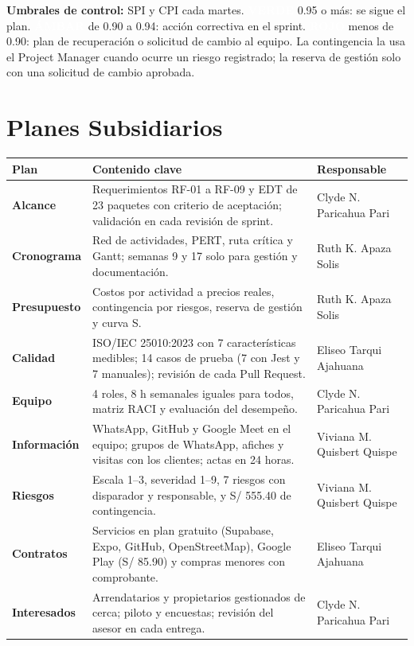 \documentclass[11pt,a4paper]{article}
\newcommand{\etiqueta}[2]{{\setlength{\fboxsep}{2pt}\colorbox{#1}{\textcolor{white}{\scriptsize\bfseries #2}}}}
\begin{document}
\vspace{0.1cm}
\noindent\textbf{Umbrales de control:} SPI y CPI cada martes. \etiqueta{Rama4}{VERDE} 0.95 o más: se sigue el plan. \etiqueta{SevMedia}{ÁMBAR} de 0.90 a 0.94: acción correctiva en el sprint. \etiqueta{SevAlta}{ROJO} menos de 0.90: plan de recuperación o solicitud de cambio al equipo. La contingencia la usa el Project Manager cuando ocurre un riesgo registrado; la reserva de gestión solo con una solicitud de cambio aprobada.

\section{Planes Subsidiarios}
{\small
{}
\noindent\begin{tabularx}{\textwidth}{@{}P{2.4cm} L P{2.8cm}@{}}
\toprule
{}
\textbf{Plan} & \textbf{Contenido clave} & \textbf{Responsable} \\
\midrule
\textbf{Alcance} & Requerimientos RF-01 a RF-09 y EDT de 23 paquetes con criterio de aceptación; validación en cada revisión de sprint. & Clyde N. Paricahua Pari \\
\textbf{Cronograma} & Red de actividades, PERT, ruta crítica y Gantt; semanas 9 y 17 solo para gestión y documentación. & Ruth K. Apaza Solis \\
\textbf{Presupuesto} & Costos por actividad a precios reales, contingencia por riesgos, reserva de gestión y curva S. & Ruth K. Apaza Solis \\
\textbf{Calidad} & ISO/IEC 25010:2023 con 7 características medibles; 14 casos de prueba (7 con Jest y 7 manuales); revisión de cada Pull Request. & Eliseo Tarqui Ajahuana \\
\textbf{Equipo} & 4 roles, 8 h semanales iguales para todos, matriz RACI y evaluación del desempeño. & Clyde N. Paricahua Pari \\
\textbf{Información} & WhatsApp, GitHub y Google Meet en el equipo; grupos de WhatsApp, afiches y visitas con los clientes; actas en 24 horas. & Viviana M. Quisbert Quispe \\
\textbf{Riesgos} & Escala 1--3, severidad 1--9, 7 riesgos con disparador y responsable, y S/ 555.40 de contingencia. & Viviana M. Quisbert Quispe \\
\textbf{Contratos} & Servicios en plan gratuito (Supabase, Expo, GitHub, OpenStreetMap), Google Play (S/ 85.90) y compras menores con comprobante. & Eliseo Tarqui Ajahuana \\
\textbf{Interesados} & Arrendatarios y propietarios gestionados de cerca; piloto y encuestas; revisión del asesor en cada entrega. & Clyde N. Paricahua Pari \\
\bottomrule
\end{tabularx}
}
\end{document}

